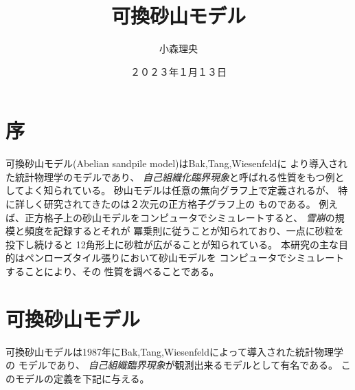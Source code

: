 \documentclass[lualatex,12pt,ja=standard]{bxjsreport}
\author{小森理央}
\title{可換砂山モデル}
\date{２０２３年１月１３日}
\begin{document}
\maketitle

\tableofcontents

\chapter{序}
可換砂山モデル(Abelian sandpile model)はBak,Tang,Wiesenfeld\cite{BTW}に
より導入された統計物理学のモデルであり、
{\em 自己組織化臨界現象}と呼ばれる性質をもつ例としてよく知られている。
砂山モデルは任意の無向グラフ上で定義されるが、
特に詳しく研究されてきたのは２次元の正方格子グラフ上の
ものである。
例えば、正方格子上の砂山モデルをコンピュータでシミュレートすると、
{\em 雪崩}の規模と頻度を記録するとそれが
冪乗則に従うことが知られており、一点に砂粒を投下し続けると
12角形上に砂粒が広がることが知られている。
本研究の主な目的はペンローズタイル張りにおいて砂山モデルを
コンピュータでシミュレートすることにより、その
性質を調べることである。


\chapter{可換砂山モデル}

可換砂山モデルは1987年にBak,Tang,Wiesenfeldによって導入された統計物理学の
モデルであり、
{\em 自己組織臨界現象}が観測出来るモデルとして有名である。
このモデルの定義を下記に与える。
\end{document}
